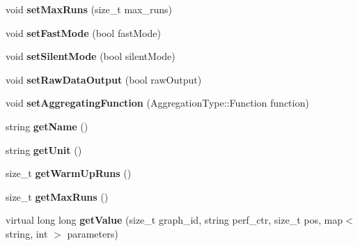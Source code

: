 \begin{DoxyCompactItemize}
\item 
\hypertarget{classAbstractBenchmark_ae29de15879d5260c69aba16e4c19729e}{void {\bfseries set\-Max\-Runs} (size\-\_\-t max\-\_\-runs)}\label{classAbstractBenchmark_ae29de15879d5260c69aba16e4c19729e}

\item 
\hypertarget{classAbstractBenchmark_a65a7a606fa92bf8aa93690e7d4cfedc8}{void {\bfseries set\-Fast\-Mode} (bool fast\-Mode)}\label{classAbstractBenchmark_a65a7a606fa92bf8aa93690e7d4cfedc8}

\item 
\hypertarget{classAbstractBenchmark_ad825d5d932ba6629840636ca40ce1e1d}{void {\bfseries set\-Silent\-Mode} (bool silent\-Mode)}\label{classAbstractBenchmark_ad825d5d932ba6629840636ca40ce1e1d}

\item 
\hypertarget{classAbstractBenchmark_a23c8c6d362dd90d7f5c57b0a4704a52f}{void {\bfseries set\-Raw\-Data\-Output} (bool raw\-Output)}\label{classAbstractBenchmark_a23c8c6d362dd90d7f5c57b0a4704a52f}

\item 
\hypertarget{classAbstractBenchmark_a71662f31a9d9a014adc17140e6d1b701}{void {\bfseries set\-Aggregating\-Function} (Aggregation\-Type\-::\-Function function)}\label{classAbstractBenchmark_a71662f31a9d9a014adc17140e6d1b701}

\item 
\hypertarget{classAbstractBenchmark_ada874371287bd5b50962bfbd55de4d37}{string {\bfseries get\-Name} ()}\label{classAbstractBenchmark_ada874371287bd5b50962bfbd55de4d37}

\item 
\hypertarget{classAbstractBenchmark_a16236f398d4cc6b7ff8c807804414fc7}{string {\bfseries get\-Unit} ()}\label{classAbstractBenchmark_a16236f398d4cc6b7ff8c807804414fc7}

\item 
\hypertarget{classAbstractBenchmark_a3d2639cbde7818000631f84212a118b7}{size\-\_\-t {\bfseries get\-Warm\-Up\-Runs} ()}\label{classAbstractBenchmark_a3d2639cbde7818000631f84212a118b7}

\item 
\hypertarget{classAbstractBenchmark_a87487cbdb2dd3d87f4b6dfea92110823}{size\-\_\-t {\bfseries get\-Max\-Runs} ()}\label{classAbstractBenchmark_a87487cbdb2dd3d87f4b6dfea92110823}

\item 
\hypertarget{classAbstractBenchmark_a73e7114c1f25f490dcd2746eb98c9f59}{virtual long long {\bfseries get\-Value} (size\-\_\-t graph\-\_\-id, string perf\-\_\-ctr, size\-\_\-t pos, map$<$ string, int $>$ parameters)}\label{classAbstractBenchmark_a73e7114c1f25f490dcd2746eb98c9f59}


\end{DoxyCompactItemize}
